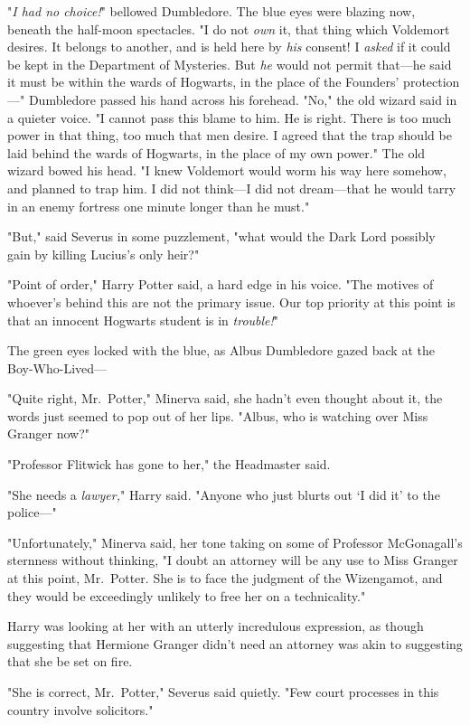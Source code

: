 "\emph{I had no choice!}" bellowed Dumbledore. The blue eyes were blazing now, 
beneath the half-moon spectacles. "I do not \emph{own} it, that thing which 
Voldemort desires. It belongs to another, and is held here by \emph{his} 
consent! I \emph{asked} if it could be kept in the Department of Mysteries. But 
\emph{he} would not permit that---he said it must be within the wards of 
Hogwarts, in the place of the Founders' protection---" Dumbledore passed his 
hand across his forehead. "No," the old wizard said in a quieter voice. "I 
cannot pass this blame to him. He is right. There is too much power in that 
thing, too much that men desire. I agreed that the trap should be laid behind 
the wards of Hogwarts, in the place of my own power." The old wizard bowed his 
head. "I knew Voldemort would worm his way here somehow, and planned to trap 
him. I did not think---I did not dream---that he would tarry in an enemy 
fortress one minute longer than he must."

"But," said Severus in some puzzlement, "what would the Dark Lord possibly gain 
by killing Lucius's only heir?"

"Point of order," Harry Potter said, a hard edge in his voice. "The motives of 
whoever's behind this are not the primary issue. Our top priority at this point 
is that an innocent Hogwarts student is in \emph{trouble!}"

The green eyes locked with the blue, as Albus Dumbledore gazed back at the 
Boy-Who-Lived---

"Quite right, Mr.~Potter," Minerva said, she hadn't even thought about it, the 
words just seemed to pop out of her lips. "Albus, who is watching over Miss 
Granger now?"

"Professor Flitwick has gone to her," the Headmaster said.

"She needs a \emph{lawyer,}" Harry said. "Anyone who just blurts out `I did it' 
to the police---"

"Unfortunately," Minerva said, her tone taking on some of Professor 
McGonagall's sternness without thinking, "I doubt an attorney will be any use 
to Miss Granger at this point, Mr.~Potter. She is to face the judgment of the 
Wizengamot, and they would be exceedingly unlikely to free her on a 
technicality."

Harry was looking at her with an utterly incredulous expression, as though 
suggesting that Hermione Granger didn't need an attorney was akin to suggesting 
that she be set on fire.

"She is correct, Mr.~Potter," Severus said quietly. "Few court processes in 
this country involve solicitors."

